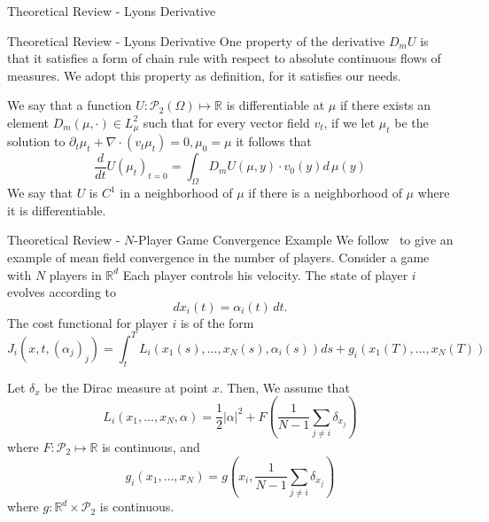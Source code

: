 \documentclass{beamer}
\newcommand{\RR}[0]{\mathbb{R}}
\begin{document}
{\begin{frame}{Theoretical Review - Lyons Derivative}
\end{frame}

\begin{frame}{Theoretical Review - Lyons Derivative}
 One property of the derivative $D_m U$ is that it satisfies a form of chain rule with respect to absolute continuous flows of measures. We adopt this property as definition, for it satisfies our needs.

\begin{definition}
We say that a function $U : \mathcal{P}_2(\Omega) \mapsto \RR$ is differentiable 
at $\mu$ if there exists an element $D_m(\mu, \cdot) \in L^2_\mu$
such that for every vector field $v_t$, if we let $\mu_t$ be the solution 
to $\partial_t \mu_t + \nabla \cdot(v_t \mu_t) = 0, \mu_0 = \mu$
it follows that
\begin{equation}\label{wass:measure_derivative_chain_rule}
    \frac{d}{dt} U{(\mu_t)}_{t = 0} = \int_\Omega D_m U(\mu, y) \cdot v_0(y) d\, \mu(y)
\end{equation}
We say that $U$ is $C^1$ in a neighborhood of $\mu$ if there is a neighborhood of $\mu$ where it is differentiable.
\end{definition}
\end{frame}

\begin{frame}{Theoretical Review - $N$-Player Game Convergence Example}
    We follow~\cite{cardaliaguet2010notes} to give an example of mean field convergence in the number of players.
Consider a game with $N$ players in $\RR^d$ Each player
controls his velocity. The state of player $i$ evolves according to
\begin{equation}
    dx_i(t) = \alpha_i(t)\, dt.
\end{equation}
The cost functional for player $i$ is of the form
\begin{equation}
    J_i(x, t, {(\alpha_j)}_j) = \int_t^T L_i (x_1(s), \dots, x_N(s), \alpha_i(s)) ds + g_i(x_1(T), \dots, x_N(T))
\end{equation}

Let $\delta_x$ be the Dirac measure at point $x$. Then, We assume that
\begin{equation}
    L_i(x_1, \dots, x_N, \alpha) = \frac{1}{2}|\alpha|^2 + F\left( \frac{1}{N-1} \sum_{j \neq i} \delta_{x_j}  \right)
\end{equation}
where $F : \mathcal{P}_2 \mapsto \RR$ is continuous, and
\begin{equation}
    g_i(x_1, \dots, x_N) = g(x_i, \frac{1}{N-1} \sum_{j\neq i} \delta_{x_j})
\end{equation}
where $g: \RR^d \times \mathcal{P}_2$ is continuous.
\end{frame}

}
\end{document}
